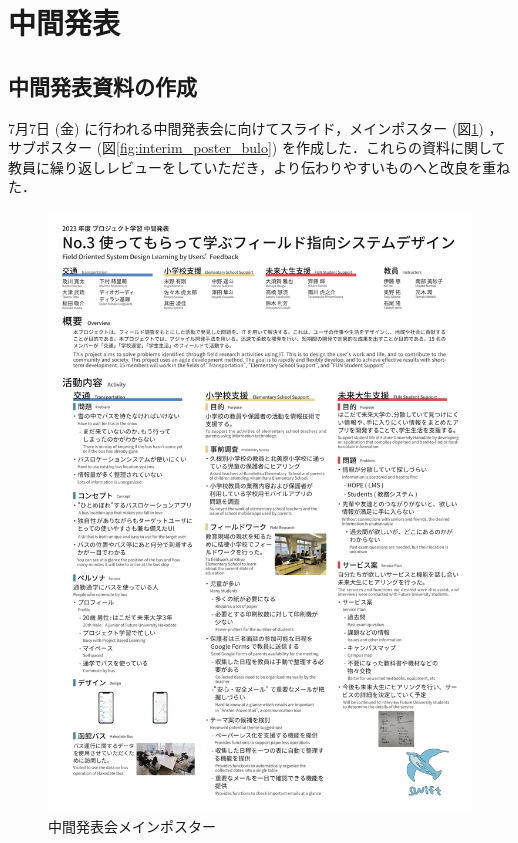 \section{中間発表}
\subsection{中間発表資料の作成}
7月7日 (金) に行われる中間発表会に向けてスライド，メインポスター (図\ref{fig:interim_poster}) ，サブポスター (図\ref{fig:interim_poster_bulo}) を作成した．これらの資料に関して教員に繰り返しレビューをしていただき，より伝わりやすいものへと改良を重ねた．

\begin{figure}[H]
    \centering
    \includegraphics[width=14cm]{images/interim_poster.png}
    \caption{中間発表会メインポスター}
    \label{fig:interim_poster}
\end{figure}

